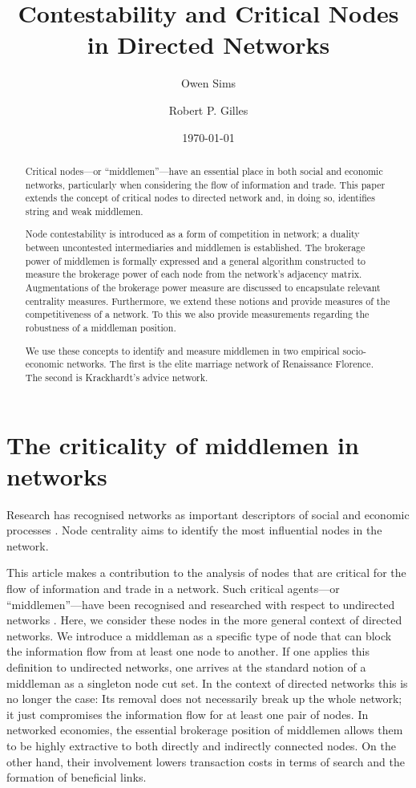 \documentclass[11pt,fleqn]{article}
\begin{document}
\title{\textbf{Contestability and Critical Nodes in Directed Networks}}
\author{Owen Sims \and Robert P. Gilles}
\date{\today}
\maketitle

\begin{abstract}
Critical nodes---or ``middlemen''---have an essential place in both social and economic networks, particularly when considering the flow of information and trade. This paper extends the concept of critical nodes to directed network and, in doing so, identifies string and weak middlemen.

Node contestability is introduced as a form of competition in network; a duality between uncontested intermediaries and middlemen is established. The brokerage power of middlemen is formally expressed and a general algorithm constructed to measure the brokerage power of each node from the network's adjacency matrix. Augmentations of the brokerage power measure are discussed to encapsulate relevant centrality measures. Furthermore, we extend these notions and provide measures of the competitiveness of a network. To this we also provide measurements regarding the robustness of a middleman position.

We use these concepts to identify and measure middlemen in two empirical socio-economic networks. The first is the elite marriage network of Renaissance Florence. The second is Krackhardt's advice network.
\end{abstract}

\newpage

\section{The criticality of middlemen in networks}

Research has recognised networks as important descriptors of social and economic processes \citep{Watts2004, Jackson2008, Newman2010, Barabasi2016}. Node centrality aims to identify the most influential nodes in the network.

This article makes a contribution to the analysis of nodes that are critical for the flow of information and trade in a network. Such critical agents---or ``middlemen''---have been recognised and researched with respect to undirected networks \citep{Burt1992}. Here, we consider these nodes in the more general context of directed networks. We introduce a middleman as a specific type of node that can block the information flow from at least one node to another. If one applies this definition to undirected networks, one arrives at the standard notion of a middleman as a singleton node cut set. In the context of directed networks this is no longer the case: Its removal does not necessarily break up the whole network; it just compromises the information flow for at least one pair of nodes. In networked economies, the essential brokerage position of middlemen allows them to be highly extractive to both directly and indirectly connected nodes. On the other hand, their involvement lowers transaction costs in terms of search and the formation of beneficial links.
\end{document}
